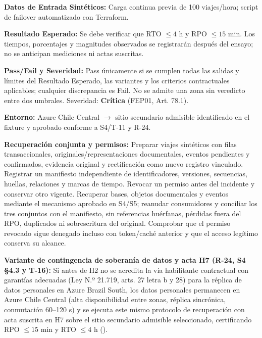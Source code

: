 \par\noindent \textbf{Datos de Entrada Sintéticos:} Carga continua previa de 100 viajes/hora; script de failover automatizado con Terraform.\par
\par\noindent \textbf{Resultado Esperado:} Se debe verificar que RTO $\le 4\text{ h}$ y RPO $\le 15\text{ min}$. Los tiempos, porcentajes y magnitudes observados se registrarán después del ensayo; no se anticipan mediciones ni actas suscritas.\par
\par\noindent \textbf{Pass/Fail y Severidad:} Pass únicamente si se cumplen todas las salidas y límites del Resultado Esperado, las variantes y los criterios contractuales aplicables; cualquier discrepancia es Fail. No se admite una zona sin veredicto entre dos umbrales. Severidad: \textbf{Crítica} (FEP01, Art. 78.1).\par
\par\noindent \textbf{Entorno:} Azure Chile Central $\rightarrow$ sitio secundario admisible identificado en el fixture y aprobado conforme a S4/T-11 y R-24.\par



\par\noindent\textbf{Recuperación conjunta y permisos:} Preparar viajes sintéticos con filas transaccionales, originales/representaciones documentales, eventos pendientes y confirmados, evidencia original y rectificación como nuevo registro vinculado. Registrar un manifiesto independiente de identificadores, versiones, secuencias, huellas, relaciones y marcas de tiempo. Revocar un permiso antes del incidente y conservar otro vigente. Recuperar bases, objetos documentales y eventos mediante el mecanismo aprobado en S4/S5; reanudar consumidores y conciliar los tres conjuntos con el manifiesto, sin referencias huérfanas, pérdidas fuera del RPO, duplicados ni sobrescritura del original. Comprobar que el permiso revocado sigue denegado incluso con token/caché anterior y que el acceso legítimo conserva su alcance.\par

\par\noindent\textbf{Variante de contingencia de soberanía de datos y acta H7 (R-24, S4 §4.3 y T-16):} Si antes de H2 no se acredita la vía habilitante contractual con garantías adecuadas (Ley N.º 21.719, arts. 27 letra b y 28) para la réplica de datos personales en Azure Brazil South, los datos personales permanecen en Azure Chile Central (alta disponibilidad entre zonas, réplica sincrónica, conmutación 60--120 s) y se ejecuta este mismo protocolo de recuperación con acta suscrita en H7 sobre el sitio secundario admisible seleccionado, certificando RPO $\le 15\text{ min}$ y RTO $\le 4\text{ h}$ ().\par


